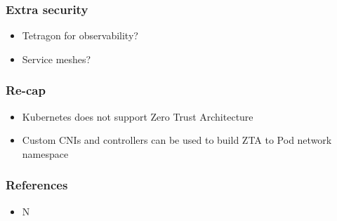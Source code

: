 \documentclass{beamer}
\begin{document}
\begin{frame}
\frametitle{Extra security}

\begin{itemize}
  \item Tetragon for observability?
  \item Service meshes?
\end{itemize}
\end{frame}

\begin{frame}
\frametitle{Re-cap}

\begin{itemize}
  \item Kubernetes does not support Zero Trust Architecture
  \item Custom CNIs and controllers can be used to build ZTA to Pod network namespace
\end{itemize}
\end{frame}

\begin{frame}
\frametitle{References}

\begin{itemize}
  \item N
\end{itemize}
\end{frame}
\end{document}
